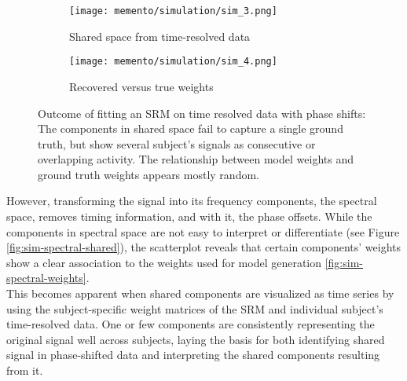 \begin{figure}
	\begin{subfigure}{.49\textwidth}
		\texttt{[image: memento/simulation/sim\_3.png]}
		\caption{Shared space from time-resolved data}
		\label{fig:sim-timeresolved-shared}
	\end{subfigure}
	\begin{subfigure}{0.49\textwidth}
		\texttt{[image: memento/simulation/sim\_4.png]}
		\caption{Recovered versus true weights}
		\label{fig:sim-timeresolved-weights}
	\end{subfigure}
	\caption{Outcome of fitting an \gls{SRM} on time resolved data with phase shifts: The components in shared space fail to capture a single ground truth, but show several subject's signals as consecutive or overlapping activity. The relationship between model weights and ground truth weights appears mostly random.}
	\label{fig:sim-timeresolved}
\end{figure}


However, transforming the signal into its frequency components, the spectral space, removes timing information, and with it, the phase offsets.
While the components in spectral space are not easy to interpret or differentiate (see Figure \ref{fig:sim-spectral-shared}), the scatterplot reveals that certain components' weights show a clear association to the weights used for model generation \ref{fig:sim-spectral-weights}.\\
This becomes apparent when shared components are visualized as time series by using the subject-specific weight matrices of the \gls{SRM} and individual subject's time-resolved data.
One or few components are consistently representing the original signal well across subjects, laying the basis for both identifying shared signal in phase-shifted data and interpreting the shared components resulting from it.


